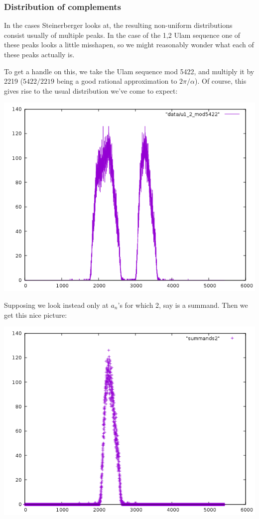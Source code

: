 \documentclass{article}
\theoremstyle{definition}
\theoremstyle{remark}
\numberwithin{equation}{section}
\begin{document}
{\subsubsection{Distribution of complements}
In the cases Steinerberger looks at, the resulting non-uniform
distributions consist usually of multiple peaks.  In the case of the
1,2 Ulam sequence one of these peaks looks a little misshapen, so we
might reasonably wonder what each of these peaks actually is.

To get a handle on this, we take the Ulam sequence mod 5422, and
multiply it by 2219 ($5422/2219$ being a good rational approximation
to $2\pi/\alpha$).  Of course, this gives rise to the usual
distribution we've come to expect:

\includegraphics[scale=0.5]{../figs/u1_2_mod5422.png}

Supposing we look instead only at $a_n$'s for which 2, say is a summand.  Then we get this nice picture:

\includegraphics[scale=0.5]{../figs/summands2.png}

}
\end{document}
